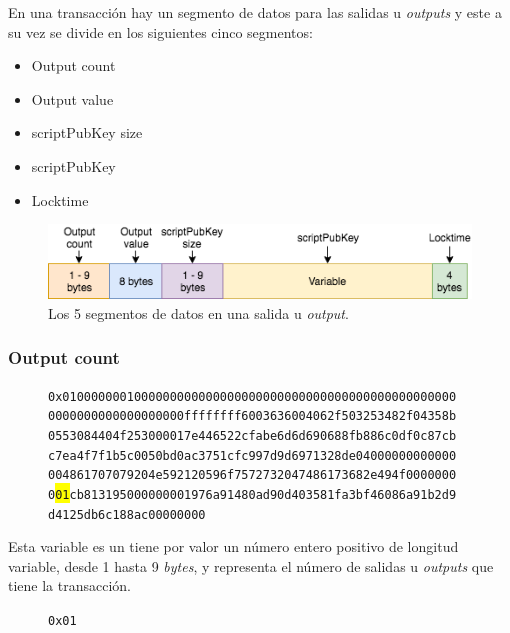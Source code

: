 \documentclass{article}
\begin{document}
    En una transacción hay un segmento de datos para las salidas u \textit{outputs} y este a su vez se divide en los siguientes cinco segmentos:
    
    \begin{itemize}
    \item Output count
    \item Output value
    \item scriptPubKey size
    \item scriptPubKey
    \item Locktime
    \end{itemize}
    
    \begin{figure}[H]
    \centering
        \includegraphics[scale=0.57]{img/Bitcoin_transactions_data_output.png}
        \caption{Los 5 segmentos de datos en una salida u \textit{output}.}
    \end{figure}
    
    \subsubsection{Output count}
    
    \begin{figure}[H]
        \texttt{0x0100000001000000000000000000000000000000000000000000000} \\
        \texttt{0000000000000000000ffffffff6003636004062f503253482f04358b} \\
        \texttt{0553084404f253000017e446522cfabe6d6d690688fb886c0df0c87cb} \\
        \texttt{c7ea4f7f1b5c0050bd0ac3751cfc997d9d6971328de04000000000000} \\
        \texttt{004861707079204e592120596f7572732047486173682e494f0000000} \\
        \texttt{0\colorbox{Yellow}{01}cb813195000000001976a91480ad90d403581fa3bf46086a91b2d9} \\
        \texttt{d4125db6c188ac00000000}
    \end{figure}
    
    Esta variable es un tiene por valor un número entero positivo de longitud variable, desde 1 hasta 9 \textit{bytes}, y representa el número de salidas u \textit{outputs} que tiene la transacción.
    \begin{figure}[H]
        \texttt{0x01}
    \end{figure}
    
\end{document}
